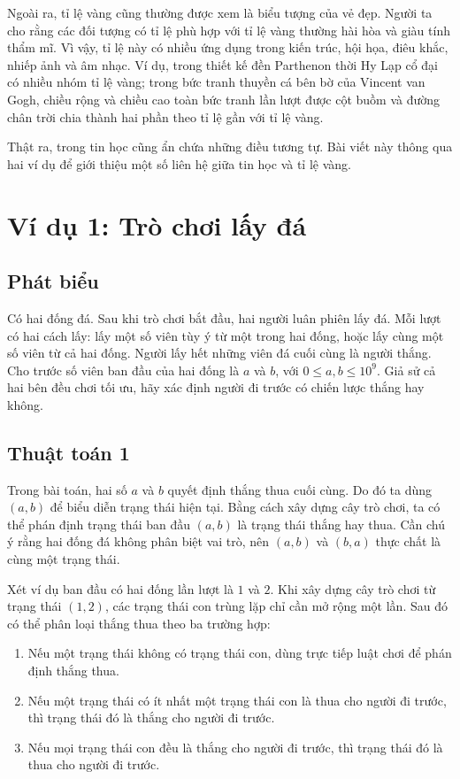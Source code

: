 \documentclass[11pt]{article}
\begin{document}
Ngoài ra, tỉ lệ vàng cũng thường được xem là biểu tượng của vẻ đẹp. Người ta
cho rằng các đối tượng có tỉ lệ phù hợp với tỉ lệ vàng thường hài hòa và giàu
tính thẩm mĩ. Vì vậy, tỉ lệ này có nhiều ứng dụng trong kiến trúc, hội họa,
điêu khắc, nhiếp ảnh và âm nhạc. Ví dụ, trong thiết kế đền Parthenon thời Hy
Lạp cổ đại có nhiều nhóm tỉ lệ vàng; trong bức tranh thuyền cá bên bờ của
Vincent van Gogh, chiều rộng và chiều cao toàn bức tranh lần lượt được cột
buồm và đường chân trời chia thành hai phần theo tỉ lệ gần với tỉ lệ vàng.

Thật ra, trong tin học cũng ẩn chứa những điều tương tự. Bài viết này thông
qua hai ví dụ để giới thiệu một số liên hệ giữa tin học và tỉ lệ vàng.

\section{Ví dụ 1: Trò chơi lấy đá}

\subsection{Phát biểu}

Có hai đống đá. Sau khi trò chơi bắt đầu, hai người luân phiên lấy đá. Mỗi
lượt có hai cách lấy: lấy một số viên tùy ý từ một trong hai đống, hoặc lấy
cùng một số viên từ cả hai đống. Người lấy hết những viên đá cuối cùng là
người thắng. Cho trước số viên ban đầu của hai đống là \(a\) và \(b\), với
\(0\le a,b\le 10^9\). Giả sử cả hai bên đều chơi tối ưu, hãy xác định người
đi trước có chiến lược thắng hay không.

\subsection{Thuật toán 1}

Trong bài toán, hai số \(a\) và \(b\) quyết định thắng thua cuối cùng. Do đó
ta dùng \((a,b)\) để biểu diễn trạng thái hiện tại. Bằng cách xây dựng cây
trò chơi, ta có thể phán định trạng thái ban đầu \((a,b)\) là trạng thái
thắng hay thua. Cần chú ý rằng hai đống đá không phân biệt vai trò, nên
\((a,b)\) và \((b,a)\) thực chất là cùng một trạng thái.

Xét ví dụ ban đầu có hai đống lần lượt là \(1\) và \(2\). Khi xây dựng cây
trò chơi từ trạng thái \((1,2)\), các trạng thái con trùng lặp chỉ cần mở rộng
một lần. Sau đó có thể phân loại thắng thua theo ba trường hợp:
\begin{enumerate}
  \item Nếu một trạng thái không có trạng thái con, dùng trực tiếp luật chơi
  để phán định thắng thua.
  \item Nếu một trạng thái có ít nhất một trạng thái con là thua cho người
  đi trước, thì trạng thái đó là thắng cho người đi trước.
  \item Nếu mọi trạng thái con đều là thắng cho người đi trước, thì trạng
  thái đó là thua cho người đi trước.
\end{enumerate}
\end{document}
